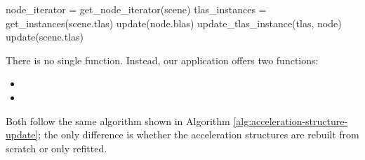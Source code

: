 \begin{algorithm}[H]

\caption{Updating acceleration structure}\label{alg:acceleration-structure-update}

\begin{algorithmic}[1]
        \State node\_iterator = get\_node\_iterator(scene)
        \State tlas\_instances = get\_instances(scene.tlas)
                    \State update(node.blas)
                \EndIf
                \State update\_tlas\_instance(tlas, node)
            \EndIf
        \EndFor
        \State update(scene.tlas)
    \EndFunction
\end{algorithmic}

\end{algorithm}

There is no single  function. Instead, our application offers two functions:

\begin{itemize}
    \item {}
    \item {}
\end{itemize}

Both follow the same algorithm shown in Algorithm \ref{alg:acceleration-structure-update}; the only difference is whether the acceleration structures are rebuilt from scratch or only refitted.

\pagebreak